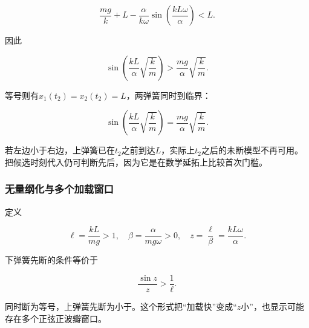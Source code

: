\documentclass[12pt,a4paper,fontset=fandol]{ctexart}
\begin{document}
\[
\frac{mg}k+L-\frac{\alpha}{k\omega}
\sin\left(\frac{kL\omega}{\alpha}\right)<L.
\]

因此

\[
\boxed{
\sin\left(\frac{kL}{\alpha}\sqrt{\frac km}\right)
>\frac{mg}{\alpha}\sqrt{\frac km}}.
\]

等号则有\(x_1(t_2)=x_2(t_2)=L\)，两弹簧同时到临界：

\[
\boxed{
\sin\left(\frac{kL}{\alpha}\sqrt{\frac km}\right)
=\frac{mg}{\alpha}\sqrt{\frac km}}.
\]

若左边小于右边，上弹簧已在\(t_2\)之前到达\(L\)，实际上\(t_2\)之后的未断模型不再可用。把候选时刻代入仍可判断先后，因为它是在数学延拓上比较首次门槛。

\subsubsection{无量纲化与多个加载窗口}\label{ux65e0ux91cfux7eb2ux5316ux4e0eux591aux4e2aux52a0ux8f7dux7a97ux53e3}

定义

\[
\ell=\frac{kL}{mg}>1,\quad
\beta=\frac{\alpha}{mg\omega}>0,\quad
z=\frac{\ell}{\beta}=\frac{kL\omega}{\alpha}.
\]

下弹簧先断的条件等价于

\[
\boxed{\frac{\sin z}{z}>\frac1\ell}.
\]

同时断为等号，上弹簧先断为小于。这个形式把``加载快''变成``\(z\)小''，也显示可能存在多个正弦正波瓣窗口。

\begin{center}
\begin{minipage}{\linewidth}
\centering\begingroup{}
\ifdim\wd\diagrambox>.88\linewidth
\sbox{\diagrambox}{\resizebox{.88\linewidth}{!}{\usebox{\diagrambox}}}\fi
\ifdim\ht\diagrambox>.38\textheight
\resizebox{!}{.38\textheight}{\usebox{\diagrambox}}
\else\usebox{\diagrambox}\fi
\par{}\endgroup\end{minipage}\end{center}
\end{document}
